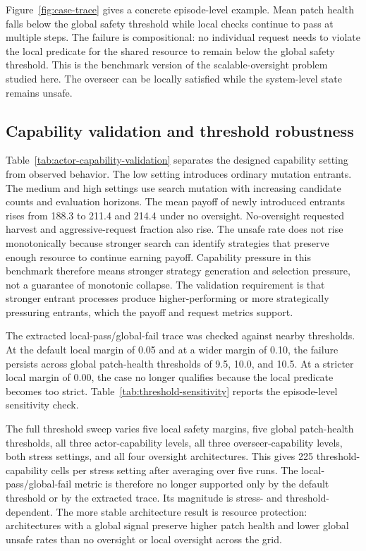 \documentclass[11pt]{article}
\begin{document}
Figure~\ref{fig:case-trace} gives a concrete episode-level example. Mean patch health falls below the global safety threshold while local checks continue to pass at multiple steps. The failure is compositional: no individual request needs to violate the local predicate for the shared resource to remain below the global safety threshold. This is the benchmark version of the scalable-oversight problem studied here. The overseer can be locally satisfied while the system-level state remains unsafe.

\subsection{Capability validation and threshold robustness}



Table~\ref{tab:actor-capability-validation} separates the designed capability setting from observed behavior. The low setting introduces ordinary mutation entrants. The medium and high settings use search mutation with increasing candidate counts and evaluation horizons. The mean payoff of newly introduced entrants rises from 188.3 to 211.4 and 214.4 under no oversight. No-oversight requested harvest and aggressive-request fraction also rise. The unsafe rate does not rise monotonically because stronger search can identify strategies that preserve enough resource to continue earning payoff. Capability pressure in this benchmark therefore means stronger strategy generation and selection pressure, not a guarantee of monotonic collapse. The validation requirement is that stronger entrant processes produce higher-performing or more strategically pressuring entrants, which the payoff and request metrics support.

The extracted local-pass/global-fail trace was checked against nearby thresholds. At the default local margin of 0.05 and at a wider margin of 0.10, the failure persists across global patch-health thresholds of 9.5, 10.0, and 10.5. At a stricter local margin of 0.00, the case no longer qualifies because the local predicate becomes too strict. Table~\ref{tab:threshold-sensitivity} reports the episode-level sensitivity check.



The full threshold sweep varies five local safety margins, five global patch-health thresholds, all three actor-capability levels, all three overseer-capability levels, both stress settings, and all four oversight architectures. This gives 225 threshold-capability cells per stress setting after averaging over five runs. The local-pass/global-fail metric is therefore no longer supported only by the default threshold or by the extracted trace. Its magnitude is stress- and threshold-dependent. The more stable architecture result is resource protection: architectures with a global signal preserve higher patch health and lower global unsafe rates than no oversight or local oversight across the grid.
\end{document}
